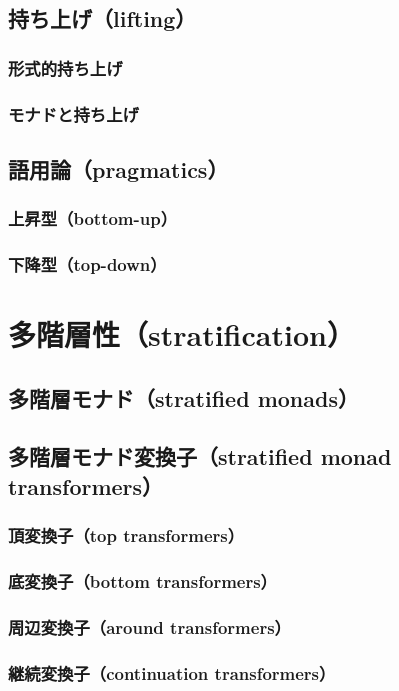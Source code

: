 \documentclass[11pt, oneside]{jsarticle}   	%
\begin{document}
\subsection{ 持ち上げ（lifting） }
\subsubsection{  形式的持ち上げ }
\subsubsection{ モナドと持ち上げ }
\subsection{ 語用論（pragmatics） }
\subsubsection{ 上昇型（bottom-up） }
\subsubsection{ 下降型（top-down） }
\section{ 多階層性（stratification）}
\subsection{ 多階層モナド（stratified monads） }
\subsection{ 多階層モナド変換子（stratified monad transformers） }
\subsubsection{ 頂変換子（top transformers） }
\subsubsection{ 底変換子（bottom transformers） }
\subsubsection{ 周辺変換子（around transformers） }
\subsubsection{ 継続変換子（continuation transformers） }
\end{document}
